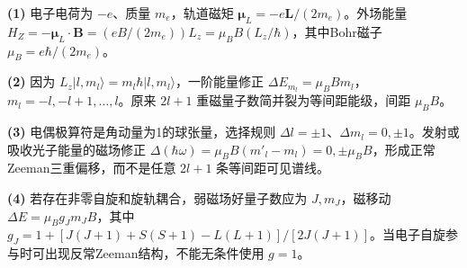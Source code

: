 \par\noindent\textbf{(1)} 电子电荷为 \(-e\)、质量 \(m_e\)，轨道磁矩 \(\boldsymbol\mu_L=-e\boldsymbol L/(2m_e)\)。外场能量 \(H_Z=-\boldsymbol\mu_L\cdot\boldsymbol B=(eB/(2m_e))L_z=\mu_B B(L_z/\hbar)\)，其中Bohr磁子 \(\mu_B=e\hbar/(2m_e)\)。
\par\noindent\textbf{(2)} 因为 \(L_z|l,m_l\rangle=m_l\hbar|l,m_l\rangle\)，一阶能量修正 \(\Delta E_{m_l}=\mu_BBm_l\)，\(m_l=-l,-l+1,\ldots,l\)。原来 \(2l+1\) 重磁量子数简并裂为等间距能级，间距 \(\mu_BB\)。
\par\noindent\textbf{(3)} 电偶极算符是角动量为1的球张量，选择规则 \(\Delta l=\pm1\)、\(\Delta m_l=0,\pm1\)。发射或吸收光子能量的磁场修正 \(\Delta(\hbar\omega)=\mu_BB(m'_l-m_l)=0,\pm\mu_BB\)，形成正常Zeeman三重偏移，而不是任意 \(2l+1\) 条等间距可见谱线。
\par\noindent\textbf{(4)} 若存在非零自旋和旋轨耦合，弱磁场好量子数应为 \(J,m_J\)，磁移动 \(\Delta E=\mu_Bg_Jm_JB\)，其中 \(g_J=1+[J(J+1)+S(S+1)-L(L+1)]/[2J(J+1)]\)。当电子自旋参与时可出现反常Zeeman结构，不能无条件使用 \(g=1\)。
